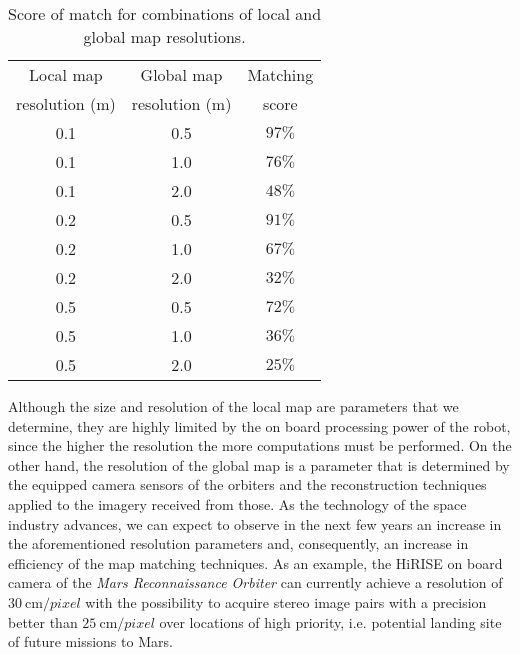 \begin{table}[h!]
    \centering
    \begin{tabular}{| c | c || c |}
        \hline
        Local map & Global map & Matching \\
        resolution (m) & resolution (m) & score \\
        \hline
        \hline
        0.1 & 0.5 & $97\%$ \\
        \hline
        0.1 & 1.0 & $76\%$ \\
        \hline
        0.1 & 2.0 & $48\%$ \\
        \hline
        \hline
        0.2 & 0.5 & $91\%$ \\
        \hline
        0.2 & 1.0 & $67\%$ \\
        \hline
        0.2 & 2.0 & $32\%$ \\
        \hline
        \hline
        0.5 & 0.5 & $72\%$ \\
        \hline
        0.5 & 1.0 & $36\%$ \\
        \hline
        0.5 & 2.0 & $25\%$ \\
        \hline
    \end{tabular}
    \caption[Local and global map resolution viability]{
        Score of match for combinations of local and global map resolutions.
    }
    \label{table:map_resolutions}
\end{table}

Although the size and resolution of the local map are parameters that we
determine, they are highly limited by the on board processing power of the
robot, since the higher the resolution the more computations must be performed.
On the other hand, the resolution of the global map is a parameter that is
determined by the equipped camera sensors of the orbiters and the
reconstruction techniques applied to the imagery received from those.
As the technology of the space industry advances, we can expect to observe
in the next few years an increase in the aforementioned resolution parameters
and, consequently, an increase in efficiency of the map matching techniques.
As an example, the HiRISE on board camera of the
\textit{Mars Reconnaissance Orbiter} can currently achieve a resolution of
$\SI{30}{\cm \per pixel}$ with the possibility to acquire stereo image pairs
with a precision better than $\SI{25}{\cm \per pixel}$ over locations of
high priority, i.e. potential landing site of future missions to Mars.

